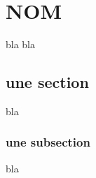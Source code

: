 \onehalfspacing
\chapter{NOM }
bla bla

 

\section{une section}
bla


\subsection{une subsection}
bla
